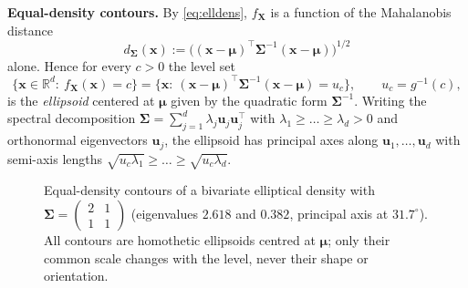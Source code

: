 \documentclass{MFM-hw} %
\newcommand{\real}{\mathbb{R}}
\newcommand{\bX}{\bm{X}}
\newcommand{\bx}{\bm{x}}
\newcommand{\bu}{\bm{u}}
\newcommand{\bmu}{\bm{\mu}}
\newcommand{\bSigma}{\bm{\Sigma}}
\begin{document}
\smallskip
\noindent\textbf{Equal-density contours.} By \eqref{eq:elldens}, $f_{\bX}$ is a function of the Mahalanobis distance
\[
    d_{\bSigma}(\bx):=\bigl((\bx-\bmu)^\top\bSigma^{-1}(\bx-\bmu)\bigr)^{1/2}
\]
alone. Hence for every $c>0$ the level set
\[
    \{\bx\in\real^d:\ f_{\bX}(\bx)=c\}=\bigl\{\bx:\ (\bx-\bmu)^\top\bSigma^{-1}(\bx-\bmu)=u_c\bigr\},
    \qquad u_c=g^{-1}(c),
\]
is the \emph{ellipsoid} centered at $\bmu$ given by the quadratic form $\bSigma^{-1}$. Writing the spectral decomposition $\bSigma=\sum_{j=1}^d\lambda_j\bu_j\bu_j^\top$ with $\lambda_1\ge\dots\ge\lambda_d>0$ and orthonormal eigenvectors $\bu_j$, the ellipsoid has principal axes along $\bu_1,\dots,\bu_d$ with semi-axis lengths $\sqrt{u_c\lambda_1}\ge\dots\ge\sqrt{u_c\lambda_d}$.

\begin{figure}[htbp]
\centering
{}
\caption{Equal-density contours of a bivariate elliptical density with $\bSigma=\left(\begin{smallmatrix}2&1\\1&1\end{smallmatrix}\right)$ (eigenvalues $2.618$ and $0.382$, principal axis at $31.7^\circ$). All contours are homothetic ellipsoids centred at $\bmu$; only their common scale changes with the level, never their shape or orientation.}
\end{figure}
\end{document}

